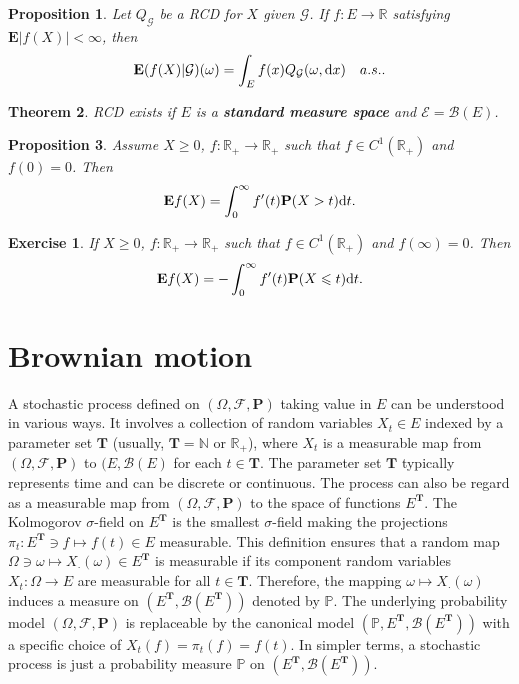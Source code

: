\documentclass[twoside, 12pt]{book}
\numberwithin{equation}{chapter}
\newtheorem{theorem}{Theorem}[section]
\newtheorem{proposition}[theorem]{Proposition}
\newtheorem{exercise}{Exercise}[section]
\def\cB{{\mathcal B}}
\def\cE{{\mathcal E}}
\def\cF{{\mathcal F}}
\def\cG{{\mathcal G}}
\def\mN{{\mathbb N}}
\def\mP{{\mathbb P}}
\def\mR{{\mathbb R}}
\def\bE{{\mathbf E}}
\def\bP{{\mathbf P}}
\def\bT{{\mathbf T}}
\def\geq{\geqslant}
\def\leq{\leqslant}
\def\d{\text{\rm{d}}}
\begin{document}
	\begin{proposition}
		Let $Q_{\cG}$ be a RCD for $X$ given $\cG$. If $f:E\to \mR$ satisfying $\bE |f(X)|<\infty$, then 
		\[
		\bE(f(X)|\cG)(\omega)= \int_{E} f(x) Q_{\cG}(\omega, \d x)\quad a.s.. 
		\]
	\end{proposition}
	
	\begin{theorem}
		RCD exists if $E$ is a {\bf standard measure space} and $\cE=\cB(E)$. 
	\end{theorem}
	
		\begin{proposition}
		Assume $X\geq 0$, $f:\mR_+\to \mR_+$ such that $f\in C^1(\mR_+)$ and $f(0)=0$. Then 
		\begin{equation}
			\bE f(X)= \int_0^\infty f'(t) \bP (X>t) \d t. 
		\end{equation}
	\end{proposition}
	\begin{exercise}
		If $X\geq 0$, $f:\mR_+\to \mR_+$ such that $f\in C^1(\mR_+)$ and $f(\infty)=0$. Then 
		\begin{equation}
			\bE f(X)= -\int_0^\infty f'(t) \bP (X\leq t) \d t. 
		\end{equation}
	\end{exercise}
	
	\section{Brownian motion}
	A stochastic process defined on $(\Omega, \cF, \bP)$ taking value in $E$ can be understood in various ways. It involves a collection of random variables $X_t\in E$ indexed by a parameter set $\bT$ (usually, $\bT=\mN$ or $\mR_+$), where $X_t$ is a measurable map from $(\Omega, \cF,\bP)$ to $(E, \cB(E)$ for each $t\in \bT$. The parameter set $\bT$ typically represents time and can be discrete or continuous. The process can also be regard as a measurable map from $(\Omega, \cF, \bP)$ to the space of functions $E^\bT$. The Kolmogorov $\sigma$-field on $E^{\bT}$ is the smallest $\sigma$-field making the projections $\pi_t: E^{\bT} \ni f\mapsto f(t)\in E$ measurable. This definition ensures that a random map  $\Omega \ni \omega \mapsto X_{\cdot}(\omega) \in E^{\bT}$ is measurable if its component random variables $X_t:\Omega \to E$ are measurable for all $t\in \bT$. Therefore, the mapping $\omega\mapsto X_{\cdot}(\omega)$ induces a measure on $(E^{\bT}, \cB(E^{\bT}))$ denoted by $\mP$. The underlying probability model $(\Omega, \cF, \bP)$ is replaceable by the canonical model $(\mP, E^{\bT}, \cB(E^{\bT}))$ with a specific choice of $X_t(f)=\pi_t(f)=f(t)$. In simpler terms, a stochastic process is just a probability measure $\mP$ on $(E^{\bT}, \cB(E^{\bT}))$.
	
\end{document}
